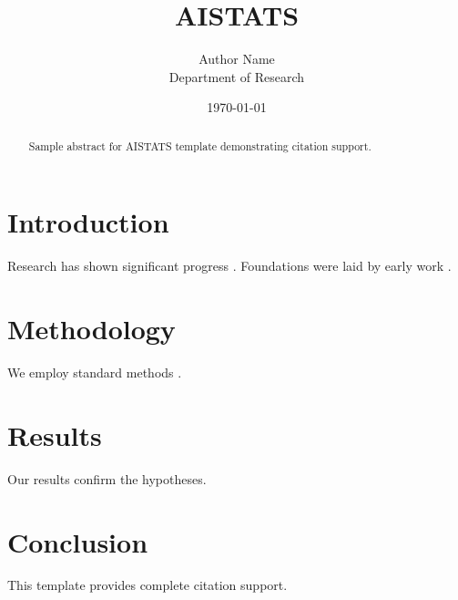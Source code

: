 \documentclass{article}
\title{AISTATS}
\author{Author Name \\ \small Department of Research}
\date{\today}
\begin{document}
\maketitle

\begin{abstract}
Sample abstract for AISTATS template demonstrating citation support.
\end{abstract}

\section{Introduction}
Research has shown significant progress \citep{einstein1905}. Foundations were laid by early work \citep{turing1950}.

\section{Methodology}
We employ standard methods \citep{knuth1984}.

\section{Results}
Our results confirm the hypotheses.

\section{Conclusion}
This template provides complete citation support.



\end{document}
